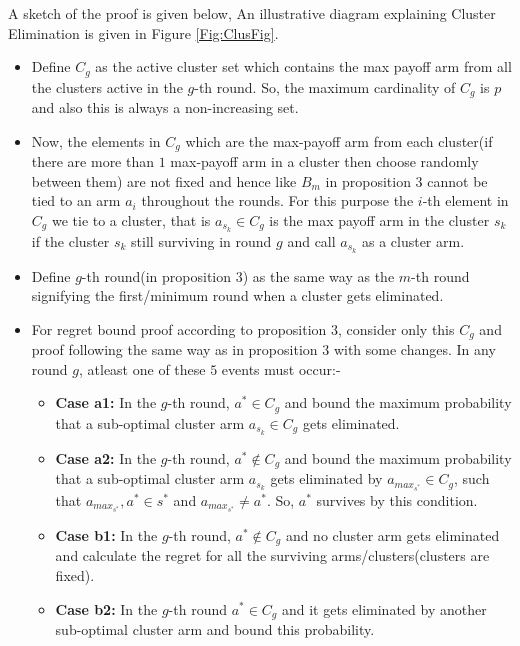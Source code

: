 \begin{remark} A sketch of the proof is given below,
\label{App:B:Rem:1}
An illustrative diagram explaining Cluster Elimination is given in Figure \ref{Fig:ClusFig}.
\newline
\begin{itemize}
\item Define $C_{g}$ as the active cluster set which contains the max payoff arm from all the clusters active in the $g$-th round. So, the maximum cardinality of $C_{g}$ is $p$ and also this is always a non-increasing set.
\item Now, the elements in $C_{g}$ which are the max-payoff arm from each cluster(if there are more than $1$ max-payoff arm in a cluster then choose randomly between them) are not fixed and hence like $B_{m}$ in proposition $3$ cannot be tied to an arm $a_{i}$ throughout the rounds. For this purpose the $i$-th element in $C_{g}$ we tie to a cluster, that is $a_{s_{k}}\in C_{g}$ is the max payoff arm in the cluster $s_{k}$ if the cluster $s_{k}$ still surviving in round $g$ and call $a_{s_{k}}$ as a cluster arm. 
\item Define $g$-th round(in proposition $3$) as the same way as the $m$-th round signifying the first/minimum round when a cluster gets eliminated.
\item For regret bound proof according to proposition $3$, consider only this $C_{g}$ and proof following the same way as in proposition $3$ with some changes. In any round $g$, atleast one of these $5$ events must occur:-
\begin{itemize}
\item \textbf{Case a1:} In the $g$-th round, $a^{*}\in C_{g}$ and bound the maximum probability that a sub-optimal cluster arm $a_{s_{k}}\in C_{g}$ gets eliminated.
\item \textbf{Case a2:} In the $g$-th round, $a^{*}\notin C_{g}$ and bound the maximum probability that a sub-optimal cluster arm $a_{s_{k}}$ gets eliminated by $a_{max_{s^{*}}}\in C_{g}$, such that $a_{max_{s^{*}}},a^{*}\in s^{*}$ and $a_{max_{s^{*}}}\neq a^{*}$. So, $a^{*}$ survives by this condition.
\item \textbf{Case b1:} In the $g$-th round, $a^{*}\notin C_{g}$ and no cluster arm gets eliminated and calculate the regret for all the surviving arms/clusters(clusters are fixed).
\item \textbf{Case b2:} In the $g$-th round $a^{*}\in C_{g}$ and it gets eliminated by another sub-optimal cluster arm and bound this probability.

\end{itemize}
\end{itemize}
\end{remark}
